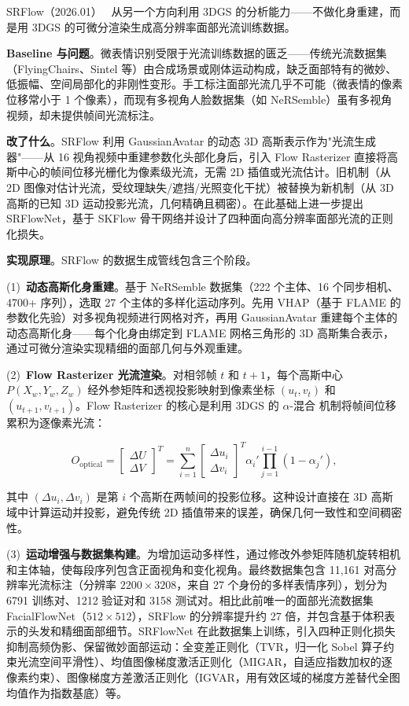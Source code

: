 SRFlow（2026.01）~\cite{2601_06479} 从另一个方向利用 3DGS 的分析能力——不做化身重建，而是用 3DGS 的可微分渲染生成高分辨率面部光流训练数据。

\textbf{Baseline 与问题}。微表情识别受限于光流训练数据的匮乏——传统光流数据集（FlyingChairs、Sintel 等）由合成场景或刚体运动构成，缺乏面部特有的微妙、低振幅、空间局部化的非刚性变形。手工标注面部光流几乎不可能（微表情的像素位移常小于 1 个像素），而现有多视角人脸数据集（如 NeRSemble）虽有多视角视频，却未提供帧间光流标注。

\textbf{改了什么}。SRFlow 利用 GaussianAvatar 的动态 3D 高斯表示作为"光流生成器"——从 16 视角视频中重建参数化头部化身后，引入 Flow Rasterizer 直接将高斯中心的帧间位移光栅化为像素级光流，无需 2D 插值或光流估计。旧机制（从 2D 图像对估计光流，受纹理缺失/遮挡/光照变化干扰）被替换为新机制（从 3D 高斯的已知 3D 运动投影光流，几何精确且稠密）。在此基础上进一步提出 SRFlowNet，基于 SKFlow 骨干网络并设计了四种面向高分辨率面部光流的正则化损失。

\textbf{实现原理}。SRFlow 的数据生成管线包含三个阶段。

(1)~\textbf{动态高斯化身重建}。基于 NeRSemble 数据集（222 个主体、16 个同步相机、4700+ 序列），选取 27 个主体的多样化运动序列。先用 VHAP（基于 FLAME 的参数化先验）对多视角视频进行网格对齐，再用 GaussianAvatar 重建每个主体的动态高斯化身——每个化身由绑定到 FLAME 网格三角形的 3D 高斯集合表示，通过可微分渲染实现精细的面部几何与外观重建。

(2)~\textbf{Flow Rasterizer 光流渲染}。对相邻帧 $t$ 和 $t+1$，每个高斯中心 $P(X_w, Y_w, Z_w)$ 经外参矩阵和透视投影映射到像素坐标 $(u_t, v_t)$ 和 $(u_{t+1}, v_{t+1})$。Flow Rasterizer 的核心是利用 3DGS 的 $\alpha$-混合 机制将帧间位移累积为逐像素光流：

\[
O_{\text{optical}} = \begin{bmatrix} \Delta U \\ \Delta V \end{bmatrix}^T = \sum_{i=1}^{n} \begin{bmatrix} \Delta u_i \\ \Delta v_i \end{bmatrix}^T \alpha_i' \prod_{j=1}^{i-1}(1 - \alpha_j'),
\]

其中 $(\Delta u_i, \Delta v_i)$ 是第 $i$ 个高斯在两帧间的投影位移。这种设计直接在 3D 高斯域中计算运动并投影，避免传统 2D 插值带来的误差，确保几何一致性和空间稠密性。

(3)~\textbf{运动增强与数据集构建}。为增加运动多样性，通过修改外参矩阵随机旋转相机和主体轴，使每段序列包含正面视角和变化视角。最终数据集包含 11{,}161 对高分辨率光流标注（分辨率 $2200 \times 3208$，来自 27 个身份的多样表情序列），划分为 6791 训练对、1212 验证对和 3158 测试对。相比此前唯一的面部光流数据集 FacialFlowNet（$512 \times 512$），SRFlow 的分辨率提升约 27 倍，并包含基于体积表示的头发和精细面部细节。SRFlowNet 在此数据集上训练，引入四种正则化损失抑制高频伪影、保留微妙面部运动：全变差正则化（TVR，归一化 Sobel 算子约束光流空间平滑性）、均值图像梯度激活正则化（MIGAR，自适应指数加权的逐像素约束）、图像梯度方差激活正则化（IGVAR，用有效区域的梯度方差替代全图均值作为指数基底）等。

